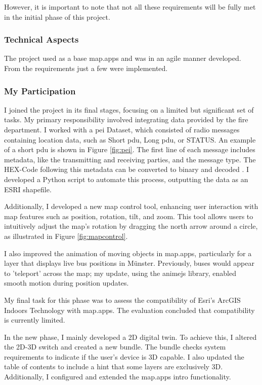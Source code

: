 \documentclass[11pt, titlepage, a4paper]{article}
\begin{document}
However, it is important to note that not all these requirements will be fully met in the initial phase of this project.


\subsubsection{Technical Aspects}
The project used as a base map.apps and was in an agile manner developed. From the requirements just a few were implemented.

\subsubsection{My Participation}
I joined the project in its final stages, focusing on a limited but significant set of tasks. My primary responsibility involved integrating data provided by the fire department. I worked with a \gls{pei} Dataset, which consisted of radio messages containing location data, such as Short \gls{pdu}, Long \gls{pdu}, or STATUS. An example of a short \gls{pdu} is shown in Figure \ref{fig:pei}. The first line of each message includes metadata, like the transmitting and receiving parties, and the message type. The HEX-Code following this metadata can be converted to binary and decoded \cite{etsiETSITS1002007}. I developed a Python script to automate this process, outputting the data as an ESRI shapefile.

Additionally, I developed a new map control tool, enhancing user interaction with map features such as position, rotation, tilt, and zoom. This tool allows users to intuitively adjust the map's rotation by dragging the north arrow around a circle, as illustrated in Figure \ref{fig:mapcontrol}.


I also improved the animation of moving objects in map.apps, particularly for a layer that displays live bus positions in Münster. Previously, buses would appear to 'teleport' across the map; my update, using the animejs library, enabled smooth motion during position updates.

My final task for this phase was to assess the compatibility of Esri's ArcGIS Indoors Technology with map.apps. The evaluation concluded that compatibility is currently limited.

In the new phase, I mainly developed a 2D digital twin. To achieve this, I altered the 2D-3D switch and created a new bundle. The bundle checks system requirements to indicate if the user's device is 3D capable. I also updated the table of contents to include a hint that some layers are exclusively 3D.
Additionally, I configured and extended the map.apps intro functionality.
\end{document}
